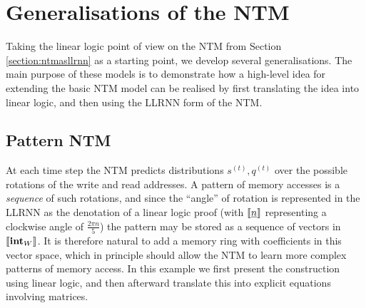 \documentclass[english,letter paper,12pt,leqno]{article}
\theoremstyle{example}
\numberwithin{equation}{section}
\begin{document}
\section{Generalisations of the NTM}


Taking the linear logic point of view on the NTM from Section \ref{section:ntmasllrnn} as a starting point, we develop several generalisations. The main purpose of these models is to demonstrate how a high-level idea for extending the basic NTM model can be realised by first translating the idea into linear logic, and then using the LLRNN form of the NTM.

\subsection{Pattern NTM}\label{example:ntm_extended}

At each time step the NTM predicts distributions $s^{(t)}, q^{(t)}$ over the possible rotations of the write and read addresses. A pattern of memory accesses is a \emph{sequence} of such rotations, and since the ``angle'' of rotation is represented in the LLRNN as the denotation of a linear logic proof (with $\llbracket \underline{n} \rrbracket$ representing a clockwise angle of $\frac{2\pi n}{5}$) the pattern may be stored as a sequence of vectors in $\llbracket \textbf{int}_W \rrbracket$. It is therefore natural to add a memory ring with coefficients in this vector space, which in principle should allow the NTM to learn more complex patterns of memory access. In this example we first present the construction using linear logic, and then afterward translate this into explicit equations involving matrices.
\end{document}

